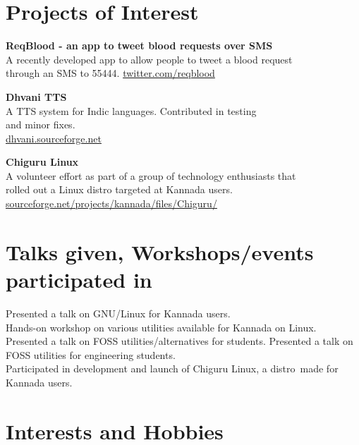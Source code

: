 \documentclass[11pt,a4paper,sans]{moderncv}
\begin{document}
\section{Projects of Interest}

\cvlistitem
{\textbf{ReqBlood - an app to tweet blood requests over SMS} 
  \\A recently developed app to allow people to tweet a blood request\\
    through an SMS to 55444.
		{\small {\url{twitter.com/reqblood}}} \\
}

\cvlistitem
{\textbf{Dhvani TTS}  
  \\A TTS system for Indic languages. Contributed in testing \\
		and minor fixes.\\
		{\small {\url{dhvani.sourceforge.net}}} \\
}

\cvlistitem
{\textbf{Chiguru Linux}  
  \\A volunteer effort as part of a group of technology enthusiasts that \\
		rolled out a Linux distro targeted at Kannada users.\\
		{\small {\url{sourceforge.net/projects/kannada/files/Chiguru/}}} \\
}

\section{Talks given, Workshops/events participated in}
{Presented a talk on GNU/Linux for Kannada users. \\
Hands-on workshop on various utilities available for Kannada on Linux.}
{Presented a talk on FOSS utilities/alternatives for students.} 
{Presented a talk on FOSS utilities for engineering students. \\
Participated in development and launch of Chiguru Linux, a distro\
made for Kannada users.}

\section{Interests and Hobbies}
\end{document}
